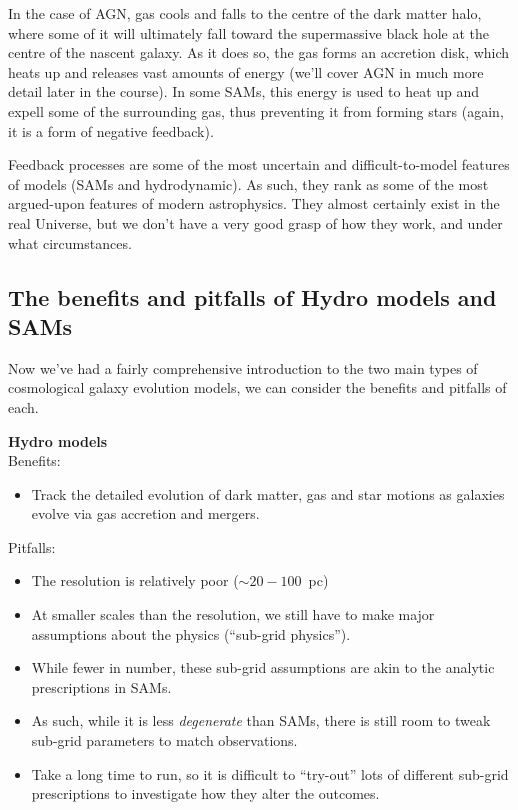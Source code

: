 \documentclass[11pt]{article}
\begin{document}
In the case of AGN, gas cools and falls to the centre of the dark
matter halo, where some of it will ultimately fall toward the
supermassive black hole at the centre of the nascent galaxy. As it
does so, the gas forms an accretion disk, which heats up and releases
vast amounts of energy (we'll cover AGN in much more detail later in
the course). In some SAMs, this energy is used to heat up and expell
some of the surrounding gas, thus preventing it from forming stars
(again, it is a form of negative feedback).

Feedback processes are some of the most uncertain and
difficult-to-model features of models (SAMs and hydrodynamic). As
such, they rank as some of the most argued-upon features of modern
astrophysics. They almost certainly exist in the real Universe, but we
don't have a very good grasp of how they work, and under what
circumstances.

\subsection{The benefits and pitfalls of Hydro models and SAMs}
Now we've had a fairly comprehensive introduction to the two main
types of cosmological galaxy evolution models, we can consider the benefits and pitfalls of each.

\noindent
{\bf Hydro models}\\
Benefits:
\begin{itemize}
\item Track the detailed evolution of dark matter, gas and star motions as galaxies evolve via gas accretion and mergers.
\end{itemize}
Pitfalls:
\begin{itemize}
\item The resolution is relatively poor ($\sim20-100$~pc)
\item At smaller scales than the resolution, we still have to make
  major assumptions about the physics (``sub-grid physics'').
\item While fewer in number, these sub-grid assumptions are akin to
  the analytic prescriptions in SAMs.
\item As such, while it is less {\it degenerate} than SAMs, there is
  still room to tweak sub-grid parameters to match observations.
\item Take a long time to run, so it is difficult to ``try-out'' lots
  of different sub-grid prescriptions to investigate how they alter
  the outcomes.
\end{itemize}
\end{document}
